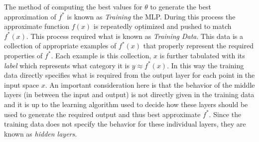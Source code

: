 \documentclass[14pt]{extarticle}
\numberwithin{equation}{section}
\begin{document}
	The method of computing the best values for $\theta$ to generate the best approximation of $f^*$ is known as \textit{Training} the MLP. During this process the approximate function $f(x)$ is repeatedly optimized and pushed to match $f^*(x)$. This process required what is known as \textit{Training Data}. This data is a collection of appropriate examples of $f^*(x)$ that properly represent the required properties of $f^*$. Each example is this collection, $x$ is further tabulated with its \textit{label} which represents what category it is $y \approx f^*(x)$. In this way the training data directly specifies what is required from the output layer for each point in the input space $x$. An important consideration here is that the behavior of the middle layers (in between the input and output) is not directly given in the training data and it is up to the learning algorithm used to decide how these layers should be used to generate the required output and thus best approximate $f^*$. Since the training data does not specify the behavior for these individual layers, they are known as \textit{hidden layers}.
	
\end{document}

